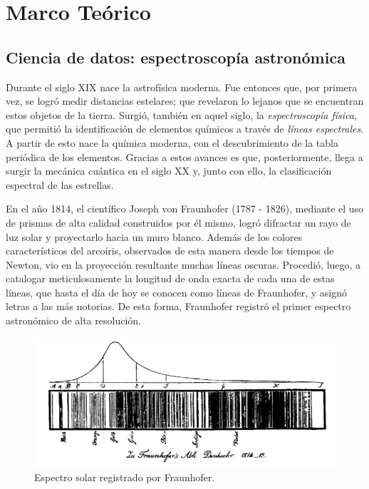 \chapter{Marco Teórico}


\section{Ciencia de datos: espectroscopía astronómica}

Durante el siglo XIX nace la astrofísica moderna. Fue entonces que, por primera vez, se logró medir distancias estelares; que revelaron lo lejanos que se encuentran estos objetos de la tierra. Surgió, también en aquel siglo, la \textit{espectroscopía física}, que permitió la identificación de elementos químicos a través de \textit{líneas espectrales}. A partir de esto nace la química moderna, con el descubrimiento de la tabla periódica de los elementos. Gracias a estos avances es que, posteriormente, llega a surgir la mecánica cuántica en el siglo XX y, junto con ello, la clasificación espectral de las estrellas.

En el año 1814, el científico Joseph von Fraunhofer (1787 - 1826), mediante el uso de prismas de alta calidad construidos por él mismo, logró difractar un rayo de luz solar y proyectarlo hacia un muro blanco. Además de los colores característicos del arcoíris, observados de esta manera desde los tiempos de Newton, vio en la proyección resultante muchas líneas oscuras. Procedió, luego, a catalogar meticulosamente la longitud de onda exacta de cada una de estas líneas, que hasta el día de hoy se conocen como líneas de Fraunhofer, y asignó letras a las más notorias. De esta forma, Fraunhofer registró el primer espectro astronómico de alta resolución.

\begin{figure}[h!]
\begin{center}
\includegraphics[width=14cm]{imagenes/fraunhofer_sun.png}
\end{center}
\vspace*{-5mm}
\caption{Espectro solar registrado por Fraunhofer.}
\label{fig:fraunhofer_sun}
\end{figure}


